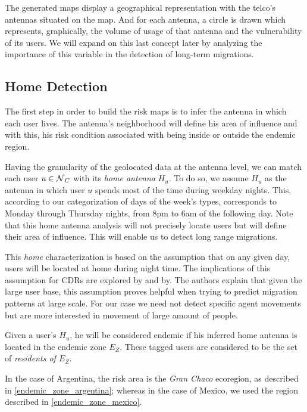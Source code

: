 The generated maps display a geographical representation with the telco's antennas situated on the map.
And for each antenna, a circle is drawn which represents, graphically, the volume of usage of that antenna and the vulnerability of its users.
We will expand on this last concept later by analyzing the importance of this variable in the detection of long-term migrations.

\subsection{Home Detection}\label{subsection:home_detection}

The first step in order to build the risk maps is to infer the antenna in which each user lives.
The antenna's neighborhood will define his area of influence and with this, his risk condition associated with being inside or outside the endemic region.

Having the granularity of the geolocated data at the antenna level, we can match each user $u \in \operatorname{\mathcal{N}}_C$ with its \textit{home antenna} $H_u$.
To do so, we assume $H_u$ as the antenna in which user $u$ spends most of the time during weekday nights.
This, according to our categorization of days of the week's types, corresponds to Monday through Thursday nights, from 8pm to 6am of the following day.
Note that this home antenna analysis will not precisely locate users but will define their area of influence.
This will enable us to detect long range migrations.

This \textit{home} characterization is based on the assumption that on any given day, users will be located at home during night time.
The implications of this assumption for CDRs are explored by\cite{sarraute2015socialevents} and by\cite{csaji2012exploring}.
The authors explain that given the large user base, this assumption proves helpful when trying to predict migration patterns at large scale.
For our case we need not detect specific agent movements but are more interested in movement of large amount of people.

Given a user's $H_u$, he will be considered endemic if his inferred home antenna is located in the endemic zone $E_Z$.
These tagged users are considered to be the set of \textit{residents of $E_Z$}.

In the case of Argentina, the risk area is the \textit{Gran Chaco} ecoregion, as described in \cref{endemic_zone_argentina};
whereas in the case of Mexico, we used the region described in \cref{endemic_zone_mexico}.


